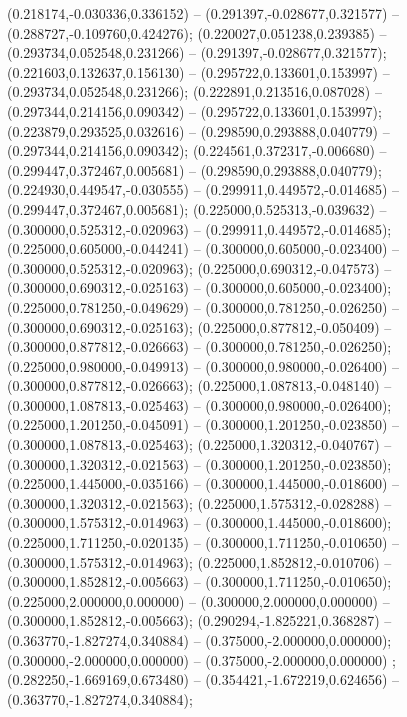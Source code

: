  (0.218174,-0.030336,0.336152) -- (0.291397,-0.028677,0.321577) -- (0.288727,-0.109760,0.424276);
 (0.220027,0.051238,0.239385) -- (0.293734,0.052548,0.231266) -- (0.291397,-0.028677,0.321577);
 (0.221603,0.132637,0.156130) -- (0.295722,0.133601,0.153997) -- (0.293734,0.052548,0.231266);
 (0.222891,0.213516,0.087028) -- (0.297344,0.214156,0.090342) -- (0.295722,0.133601,0.153997);
 (0.223879,0.293525,0.032616) -- (0.298590,0.293888,0.040779) -- (0.297344,0.214156,0.090342);
 (0.224561,0.372317,-0.006680) -- (0.299447,0.372467,0.005681) -- (0.298590,0.293888,0.040779);
 (0.224930,0.449547,-0.030555) -- (0.299911,0.449572,-0.014685) -- (0.299447,0.372467,0.005681);
 (0.225000,0.525313,-0.039632) -- (0.300000,0.525312,-0.020963) -- (0.299911,0.449572,-0.014685);
 (0.225000,0.605000,-0.044241) -- (0.300000,0.605000,-0.023400) -- (0.300000,0.525312,-0.020963);
 (0.225000,0.690312,-0.047573) -- (0.300000,0.690312,-0.025163) -- (0.300000,0.605000,-0.023400);
 (0.225000,0.781250,-0.049629) -- (0.300000,0.781250,-0.026250) -- (0.300000,0.690312,-0.025163);
 (0.225000,0.877812,-0.050409) -- (0.300000,0.877812,-0.026663) -- (0.300000,0.781250,-0.026250);
 (0.225000,0.980000,-0.049913) -- (0.300000,0.980000,-0.026400) -- (0.300000,0.877812,-0.026663);
 (0.225000,1.087813,-0.048140) -- (0.300000,1.087813,-0.025463) -- (0.300000,0.980000,-0.026400);
 (0.225000,1.201250,-0.045091) -- (0.300000,1.201250,-0.023850) -- (0.300000,1.087813,-0.025463);
 (0.225000,1.320312,-0.040767) -- (0.300000,1.320312,-0.021563) -- (0.300000,1.201250,-0.023850);
 (0.225000,1.445000,-0.035166) -- (0.300000,1.445000,-0.018600) -- (0.300000,1.320312,-0.021563);
 (0.225000,1.575312,-0.028288) -- (0.300000,1.575312,-0.014963) -- (0.300000,1.445000,-0.018600);
 (0.225000,1.711250,-0.020135) -- (0.300000,1.711250,-0.010650) -- (0.300000,1.575312,-0.014963);
 (0.225000,1.852812,-0.010706) -- (0.300000,1.852812,-0.005663) -- (0.300000,1.711250,-0.010650);
 (0.225000,2.000000,0.000000) -- (0.300000,2.000000,0.000000) -- (0.300000,1.852812,-0.005663);
 (0.290294,-1.825221,0.368287) -- (0.363770,-1.827274,0.340884) -- (0.375000,-2.000000,0.000000);
 (0.300000,-2.000000,0.000000) -- (0.375000,-2.000000,0.000000) ;
 (0.282250,-1.669169,0.673480) -- (0.354421,-1.672219,0.624656) -- (0.363770,-1.827274,0.340884);
